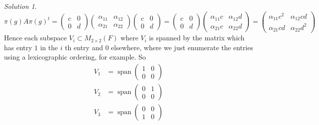 \documentclass[reqno]{amsart}
\theoremstyle{definition}
\theoremstyle{remark}
\newtheorem*{solution}{Solution}
\DeclareMathOperator{\Span}{span}
\begin{document}
\begin{solution}
        \[
        \pi(g) A \pi(g)^{t}
        = 
        \begin{pmatrix} c & 0 \\
        0 & d \end{pmatrix} 
            \begin{pmatrix} \alpha_{11} & 
            \alpha_{12} \\
        \alpha_{21} & \alpha_{22} \end{pmatrix} 
                \begin{pmatrix} c & 0 \\
                0 & d \end{pmatrix} 
                =
                \begin{pmatrix}
                    c & 0\\0 & d
                \end{pmatrix} 
                    \begin{pmatrix} \alpha_{11} c &
                        \alpha_{12} d\\
                        \alpha_{21} c & 
                        \alpha_{22} d
                    \end{pmatrix} 
                    = \begin{pmatrix} 
                        \alpha_{11} c^2 & \alpha_{12} cd\\
                        \alpha_{21} cd & \alpha_{22} d^2
                    \end{pmatrix} 
        \] 
        Hence each subspace
        $V_i \subset 
        M_{2\times 2}(F)$ where
        $V_i$ is spanned by the matrix
        which has entry $1$ in the $i$ th entry and $0$ elsewhere,
        where we just enumerate the entries using a lexicographic
        ordering, for example.
        So
        \begin{align*}
            V_1 
            &= \Span  \begin{pmatrix} 1 & 0\\
            0 & 0\end{pmatrix} \\
            V_2 
            &= \Span \begin{pmatrix} 0 & 1 \\0 & 0 \end{pmatrix} \\
            V_3 &= \Span \begin{pmatrix} 0 & 0 \\ 1 & 0 \end{pmatrix} \\

\end{align*}
\end{solution}
\end{document}
